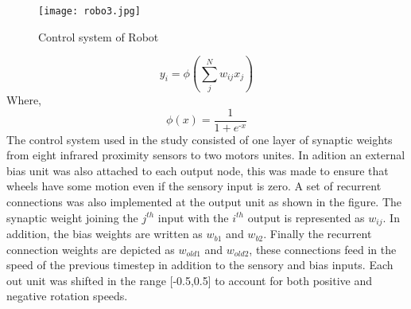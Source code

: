 \documentclass[12pt]{elsarticle}
\begin{document}
\begin{figure}[h]
\centering\texttt{[image: robo3.jpg]}
\caption{Control system of Robot}
\end{figure}

\begin{equation}
y_i = \phi(\sum_{j}^{N} w_{ij}x_j)
\end{equation}
Where, 
\begin{equation}
\phi(\textit{x}) = \frac{1}{1+e^{\textit{-x}}}
\end{equation}
The control system used in the study consisted of one layer of synaptic weights from eight infrared proximity sensors to two motors unites. 
In adition an external bias unit was also attached to each output node, this was made to ensure that wheels have some motion even if the sensory input is zero. 
A set of recurrent connections was also implemented at the output unit as shown in the figure. 
The synaptic weight joining the $j^{th}$ input with the $i^{th}$ output is represented as $w_{ij}$. In addition, the bias weights are written as $w_{b1}$ and $w_{b2}$. 
Finally the recurrent connection weights are depicted as $w_{old1}$ and $w_{old2}$, these connections feed in the speed of the previous timestep in addition to the sensory and bias inputs.  Each out unit was shifted in the range [-0.5,0.5] to account for both positive and negative rotation speeds. 
\end{document}
